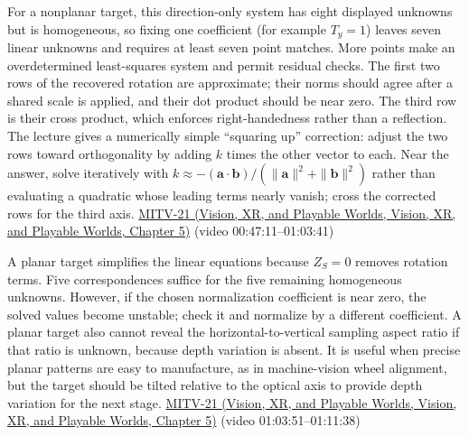 For a nonplanar target, this direction-only system has eight displayed unknowns but is homogeneous, so fixing one coefficient (for example \(T_y=1\)) leaves seven linear unknowns and requires at least seven point matches. More points make an overdetermined least-squares system and permit residual checks. The first two rows of the recovered rotation are approximate; their norms should agree after a shared scale is applied, and their dot product should be near zero. The third row is their cross product, which enforces right-handedness rather than a reflection. The lecture gives a numerically simple ``squaring up'' correction: adjust the two rows toward orthogonality by adding \(k\) times the other vector to each. Near the answer, solve iteratively with \(k\approx-(\mathbf{a}\cdot\mathbf{b})/(\|\mathbf{a}\|^2+\|\mathbf{b}\|^2)\) rather than evaluating a quadratic whose leading terms nearly vanish; cross the corrected rows for the third axis. \href{../07-Vision-XR-and-Playable-Worlds/main.pdf\#nameddest=04-visual-computing-ii-ch036-mitv-21---relative-orientation-binocular-stereo-structure-quadrics-calibration-reprojection}{MITV-21 (Vision, XR, and Playable Worlds, Vision, XR, and Playable Worlds, Chapter 5)} (video 00:47:11--01:03:41)

A planar target simplifies the linear equations because \(Z_S=0\) removes rotation terms. Five correspondences suffice for the five remaining homogeneous unknowns. However, if the chosen normalization coefficient is near zero, the solved values become unstable; check it and normalize by a different coefficient. A planar target also cannot reveal the horizontal-to-vertical sampling aspect ratio if that ratio is unknown, because depth variation is absent. It is useful when precise planar patterns are easy to manufacture, as in machine-vision wheel alignment, but the target should be tilted relative to the optical axis to provide depth variation for the next stage. \href{../07-Vision-XR-and-Playable-Worlds/main.pdf\#nameddest=04-visual-computing-ii-ch036-mitv-21---relative-orientation-binocular-stereo-structure-quadrics-calibration-reprojection}{MITV-21 (Vision, XR, and Playable Worlds, Vision, XR, and Playable Worlds, Chapter 5)} (video 01:03:51--01:11:38)

